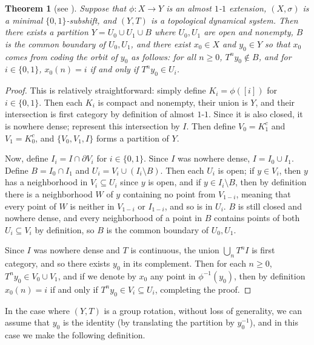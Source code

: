 \documentclass[11pt,reqno]{amsart}
\newtheorem{theorem}{Theorem}[section]
\theoremstyle{definition}
\theoremstyle{plain}
\begin{document}
\begin{theorem}[see {\cite[Theorem 6.4]{cocycles}}]
\label{coding}
Suppose that $\phi: X \rightarrow Y$ is an almost $1$-$1$ extension, $(X, \sigma)$ is a minimal $\{0, 1\}$-subshift, and $(Y, T)$ is a topological dynamical system. Then there exists a partition
$Y = U_0 \cup U_1 \cup B$ where $U_0, U_1$ are open and nonempty, $B$ is the common boundary of $U_0, U_1$, and there exist $x_0 \in X$ and $y_0 \in Y$ so that $x_0$ comes from coding the orbit of $y_0$ as follows: for all $n \geq 0$, $T^n y_0 \notin B$, and for $i \in \{0, 1\}$, $x_0(n) = i$ if and only if $T^n y_0 \in U_i$.
\end{theorem}

\begin{proof}
This is relatively straightforward: simply define $K_i = \phi([i])$ for $i \in \{0,1\}$. Then each $K_i$ is compact and nonempty, their union is $Y$, and their intersection is first category by definition of almost $1$-$1$. Since it is also closed, it is nowhere dense; represent this intersection by $I$. Then define $V_0 = K_1^c$ and $V_1 = K_0^c$, and $\{V_0, V_1, I\}$ forms a partition of $Y$. 

Now, define $I_i = I \cap \partial V_i$ for $i \in \{0,1\}$. Since $I$ was nowhere dense, $I = I_0 \cup I_1$. Define $B = I_0 \cap I_1$ and
$U_i = V_i \cup (I_i \setminus B)$. Then each $U_i$ is open; if $y \in V_i$, then $y$ has a neighborhood in $V_i \subseteq U_i$ since $y$ is open, and if $y \in I_i \setminus B$, then by definition there is a neighborhood $W$ of $y$ containing no point from $V_{1-i}$, meaning that every point of $W$ is neither in $V_{1-i}$ or $I_{1-i}$, and so is in $U_i$. $B$ is still closed and nowhere dense, and every neighborhood of a point in $B$ contains points of both $U_i \subseteq V_i$ by definition, so $B$ is the common boundary of $U_0, U_1$.

Since $I$ was nowhere dense and $T$ is continuous, the union $\bigcup_n T^n I$ is first category, and so there exists $y_0$ in its complement. Then for each $n \geq 0$, $T^n y_0 \in V_0 \cup V_1$, and if we denote by $x_0$ any point in $\phi^{-1}(y_0)$, then by definition
$x_0(n) = i$ if and only if $T^n y_0 \in V_i \subseteq U_i$, completing the proof.
\end{proof}

In the case where $(Y, T)$ is a group rotation, without loss of generality, we can assume that $y_0$ is the identity (by translating the partition by $y_0^{-1}$), and in this case we make the following definition.
\end{document}
